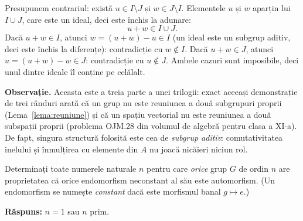 \begin{solutie}
Presupunem contrariul: există $u \in I \setminus J$ și $w \in J \setminus I$. Elementele $u$ și $w$ aparțin lui $I \cup J$, care este un ideal, deci este închis la adunare:
\[
u + w \in I \cup J.
\]
Dacă $u + w \in I$, atunci $w = (u + w) - u \in I$ (un ideal este un subgrup aditiv, deci este închis la diferențe): contradicție cu $w \notin I$. Dacă $u + w \in J$, atunci $u = (u + w) - w \in J$: contradicție cu $u \notin J$. Ambele cazuri sunt imposibile, deci unul dintre ideale îl conține pe celălalt.

\medskip
\noindent\textbf{Observație.} Aceasta este a treia parte a unei trilogii: exact aceeași demonstrație de trei rânduri arată că un grup nu este reuniunea a două subgrupuri proprii (Lema~\ref{lema:reuniune}) și că un spațiu vectorial nu este reuniunea a două subspații proprii (problema OJM.28 din volumul de algebră pentru clasa a XI-a). De fapt, singura structură folosită este cea de \emph{subgrup aditiv}: comutativitatea inelului și înmulțirea cu elemente din $A$ nu joacă nicăieri niciun rol.
\end{solutie}

\begin{problema}
Determinați toate numerele naturale $n$ pentru care \emph{orice} grup
$G$ de ordin $n$ are proprietatea că orice endomorfism neconstant al
său este automorfism. (Un endomorfism se numește \emph{constant}
dacă este morfismul banal $g \mapsto e$.)
\end{problema}

\noindent\textbf{Răspuns:} $n=1$ sau $n$ prim.

